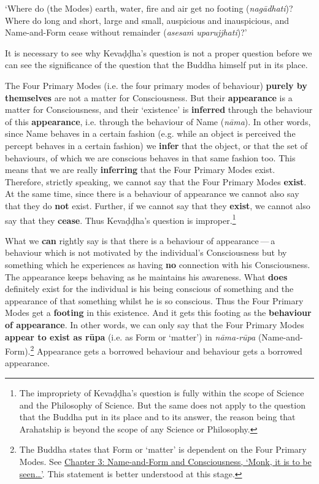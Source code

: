 `Where do (the Modes) earth, water, fire and air get no footing (\emph{nagādhati})? Where do long and short, large and small, auspicious and inauspicious, and Name-and-Form cease without remainder (\emph{asesaṁ uparujjhati})?'

It is necessary to see why Kevaḍḍha's question is not a proper question before we can see the significance of the question that the Buddha himself put in its place.

\protect\hypertarget{the-four-primary}{}{}The Four Primary Modes (i.e. the four primary modes of behaviour) \textbf{purely by themselves} are not a matter for Consciousness. But their \textbf{appearance} is a matter for Consciousness, and their `existence' is \textbf{inferred} through the behaviour of this \textbf{appearance}, i.e. through the behaviour of Name (\emph{nāma}). In other words, since Name behaves in a certain fashion (e.g. while an object is perceived the percept behaves in a certain fashion) we \textbf{infer} that the object, or that the set of behaviours, of which we are conscious behaves in that same fashion too. This means that we are really \textbf{inferring} that the Four Primary Modes exist. Therefore, strictly speaking, we cannot say that the Four Primary Modes \textbf{exist}. At the same time, since there is a behaviour of appearance we cannot also say that they do \textbf{not} exist. Further, if we cannot say that they \textbf{exist}, we cannot also say that they \textbf{cease}. Thus Kevaḍḍha's question is improper.\footnote{The impropriety of Kevaḍḍha's question is fully within the scope of Science and the Philosophy of Science. But the same does not apply to the question that the Buddha put in its place and to its answer, the reason being that Arahatship is beyond the scope of any Science or Philosophy.}

What we \textbf{can} rightly say is that there is a behaviour of appearance --- a behaviour which is not motivated by the individual's Consciousness but by something which he experiences as having \textbf{no} connection with his Consciousness. The appearance keeps behaving as he maintains his awareness. What \textbf{does} definitely exist for the individual is his being conscious of something and the appearance of that something whilst he is so conscious. Thus the Four Primary Modes get a \textbf{footing} in this existence. And it gets this footing as the \textbf{behaviour of appearance}. In other words, we can only say that the Four Primary Modes \textbf{appear to exist as rūpa} (i.e. as Form or `matter') in \emph{nāma-rūpa} (Name-and-Form).\footnote{The Buddha states that Form or `matter' is dependent on the Four Primary Modes. See \href{ch-03-name-and-form-and-consciousness.xml\#dependent}{Chapter 3: Name-and-Form and Consciousness, `Monk, it is to be seen\ldots\hspace{0pt}'}. This statement is better understood at this stage.} Appearance gets a borrowed behaviour and behaviour gets a borrowed appearance.

